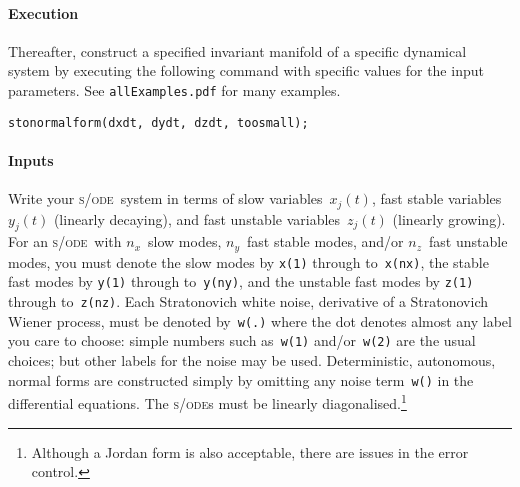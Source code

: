 \documentclass[11pt,a5paper]{article}
\def\sde{\textsc{s/ode}}
\begin{document}
\paragraph{Execution}
Thereafter, construct a specified invariant manifold of a
specific dynamical system by executing the following command
with specific values for the input parameters.  See
\verb|allExamples.pdf| for many examples.
\begin{verbatim}
stonormalform(dxdt, dydt, dzdt, toosmall);
\end{verbatim}


\paragraph{Inputs}
Write your \sde\ system in terms of slow variables~\(x_j(t)\), fast stable variables~\(y_j(t)\) (linearly decaying), and fast unstable variables~\(z_j(t)\) (linearly growing). 
For an \sde\ with $n_x$~slow modes, $n_y$~fast stable modes, and/or \(n_z\)~fast unstable modes, you must denote the slow modes by \verb|x(1)| through to~\verb|x(nx)|, the stable fast modes by \verb|y(1)| through to~\verb|y(ny)|, and the unstable fast modes by \verb|z(1)| through to~\verb|z(nz)|.
Each Stratonovich white noise, derivative of a Stratonovich Wiener process, must be denoted by~\verb|w(.)| where the dot denotes almost any label you care to choose: simple numbers such as~\verb|w(1)| and/or~\verb|w(2)| are the usual choices; but other labels for the noise may be used.
Deterministic, autonomous, normal forms are constructed simply by omitting any noise term~\verb|w()| in the differential equations.
The \sde{}s must be linearly diagonalised.\footnote{Although a Jordan form is also acceptable, there are issues in the error control.}  
\end{document}
